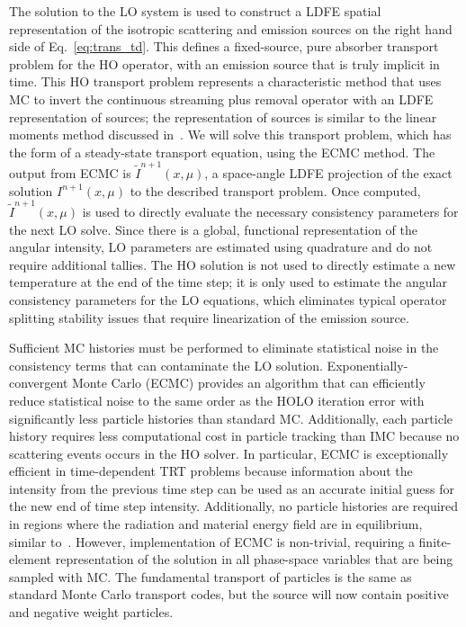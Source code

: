 The solution to the LO system is used to construct a LDFE spatial representation of
the isotropic scattering and emission sources on the right hand side of
Eq.~\eqref{eq:trans_td}.    This defines a fixed-source, pure absorber
transport problem for the HO operator, with an emission source that is truly implicit in
time. This HO transport problem represents a characteristic method that uses MC to
invert the continuous streaming plus removal operator with an LDFE representation of
sources; the representation of sources is similar to the linear moments method
discussed in~\cite{larsen_error}.  We will solve this transport problem, which has
the form of a steady-state transport equation, using the ECMC method.  The output from ECMC is
$\tilde{I}^{n+1}(x,\mu)$, a space-angle LDFE projection of the exact solution
$I^{n+1}(x,\mu)$ to the described transport problem.  Once computed, $\tilde{I}^{n+1}(x,\mu)$ is used
to directly evaluate the necessary consistency parameters for the next LO solve.  Since there is a global, functional representation of
the angular intensity,  LO parameters are estimated using quadrature and do not
require additional tallies.  The HO solution is not used to directly estimate a new
temperature at the end of the time step; it is
only used to estimate the angular consistency parameters for the LO equations, which eliminates
typical operator splitting stability issues that require linearization of the emission source.

Sufficient MC histories must be performed to eliminate statistical
noise in the consistency terms that can contaminate the LO solution.
Exponentially-convergent Monte Carlo (ECMC)\cite{jake,ans_2014} provides an algorithm that can efficiently
reduce statistical noise to the same order as the HOLO iteration error with
significantly less particle histories than standard MC.  Additionally, each particle
history requires less computational cost in particle tracking than IMC because no
scattering events occurs in the HO solver. In particular, ECMC is
exceptionally efficient in time-dependent TRT problems because information about the
intensity from the previous time step can be used as an accurate initial guess for
the new end of time step intensity. Additionally, no particle histories are required
in regions where the radiation and material energy field are in equilibrium, similar to~\cite{rmc}.  However, implementation
of ECMC is non-trivial, requiring a finite-element representation of the solution in
all phase-space variables that are being sampled with MC.  The fundamental transport of particles is the same
as standard Monte Carlo transport codes, but the source will now contain positive and
negative weight particles.

